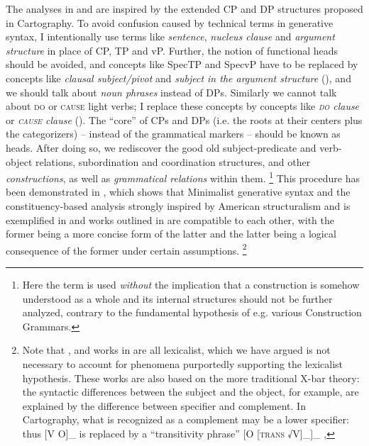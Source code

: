 \documentclass[UTF8, a4paper, oneside, scheme=plain, 12pt]{ctexrep}
\newcommand*{\term}[1]{\emph{#1}}
\newcommand*{\category}[1]{\textsc{#1}}
\begin{document}
{The analyses in  and  are inspired by the extended CP and DP structures proposed in Cartography.
To avoid confusion caused by technical terms in generative syntax,
I intentionally use terms like \term{sentence}, \term{nucleus clause} and \term{argument structure} in place of CP, TP and vP.
Further, the notion of functional heads should be avoided, and concepts like SpecTP and SpecvP have to be replaced by concepts like \term{clausal subject/pivot} and \term{subject in the argument structure} (),
and we should talk about \term{noun phrases} instead of DPs.
Similarly we cannot talk about \category{do} or \category{cause} light verbs;
I replace these concepts by concepts like \term{\category{do} clause} or \term{\category{cause} clause} ().
The ``core'' of CPs and DPs (i.e. the roots at their centers plus the categorizers) -- instead of the grammatical markers -- should be known as heads. 
After doing so, we rediscover the good old subject-predicate and verb-object relations,
subordination and coordination structures, and other \term{constructions}, as well as \term{grammatical relations} within them.%
\footnote{
    Here the term is used \emph{without} the implication 
    that a construction is somehow understood as a whole 
    and its internal structures should not be further analyzed,
    contrary to the fundamental hypothesis of e.g. various Construction Grammars.
}
This procedure has been demonstrated in \citet{deng2010},
which shows that Minimalist generative syntax and the constituency-based analysis strongly inspired by American structuralism and is exemplified in \citet{cgel} and works outlined in  are compatible to each other,
with the former being a more concise form of the latter 
and the latter being a logical consequence of the former under certain assumptions.%
\footnote{
    Note that \citet{deng2010}, \citet{cgel} and works in  are all lexicalist, which we have argued is not necessary to account for phenomena purportedly supporting the lexicalist hypothesis.
    These works are also based on the more traditional X-bar theory:
    the syntactic differences between the subject and the object, for example,
    are explained by the difference between specifier and complement.
    In Cartography, what is recognized as a complement may be a lower specifier:
    thus [V O]_{} is replaced by a ``transitivity phrase'' [O [\category{trans} √V]_{\text{\category{trans}'}}]_{\text{\category{trans}P}} \citep{siddiqi2009syntax},
}}
\end{document}

